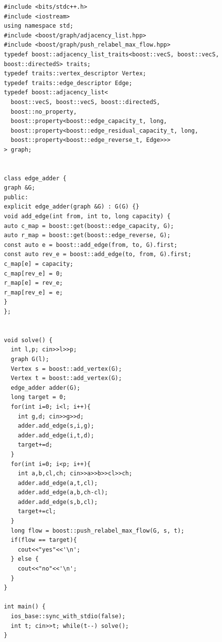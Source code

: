 \documentclass[12pt,a4paper]{article}
\begin{document}
\begin{lstlisting}[style=code]
#include <bits/stdc++.h>
#include <iostream>
using namespace std;
#include <boost/graph/adjacency_list.hpp>
#include <boost/graph/push_relabel_max_flow.hpp>
typedef boost::adjacency_list_traits<boost::vecS, boost::vecS, boost::directedS> traits;
typedef traits::vertex_descriptor Vertex;
typedef traits::edge_descriptor Edge;
typedef boost::adjacency_list<
  boost::vecS, boost::vecS, boost::directedS,
  boost::no_property,
  boost::property<boost::edge_capacity_t, long,
  boost::property<boost::edge_residual_capacity_t, long,
  boost::property<boost::edge_reverse_t, Edge>>>
> graph;


class edge_adder {
graph &G;
public:
explicit edge_adder(graph &G) : G(G) {}
void add_edge(int from, int to, long capacity) {
auto c_map = boost::get(boost::edge_capacity, G);
auto r_map = boost::get(boost::edge_reverse, G);
const auto e = boost::add_edge(from, to, G).first;
const auto rev_e = boost::add_edge(to, from, G).first;
c_map[e] = capacity;
c_map[rev_e] = 0;
r_map[e] = rev_e;
r_map[rev_e] = e;
}
};


void solve() {
  int l,p; cin>>l>>p;
  graph G(l);
  Vertex s = boost::add_vertex(G);
  Vertex t = boost::add_vertex(G);
  edge_adder adder(G);
  long target = 0;
  for(int i=0; i<l; i++){
    int g,d; cin>>g>>d;
    adder.add_edge(s,i,g);
    adder.add_edge(i,t,d);
    target+=d;
  }
  for(int i=0; i<p; i++){
    int a,b,cl,ch; cin>>a>>b>>cl>>ch;
    adder.add_edge(a,t,cl);
    adder.add_edge(a,b,ch-cl);
    adder.add_edge(s,b,cl);
    target+=cl;
  }
  long flow = boost::push_relabel_max_flow(G, s, t);
  if(flow == target){
    cout<<"yes"<<'\n';
  } else {
    cout<<"no"<<'\n';
  }
}

int main() {
  ios_base::sync_with_stdio(false);
  int t; cin>>t; while(t--) solve();
}
\end{lstlisting}
\end{document}
